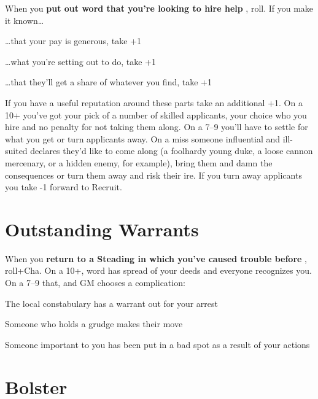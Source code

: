 When you {\bf put out word that you're looking to hire help} , roll. If you make it known…

 
\startitemize[1,packed]

\item …that your pay is generous, take +1

 
\item …what you're setting out to do, take +1

 
\item …that they'll get a share of whatever you find, take +1


\stopitemize
 

If you have a useful reputation around these parts take an additional +1. On a 10+ you've got your pick of a number of skilled applicants, your choice who you hire and no penalty for not taking them along. On a 7–9 you'll have to settle for what you get or turn applicants away. On a miss someone influential and ill-suited declares they'd like to come along (a foolhardy young duke, a loose cannon mercenary, or a hidden enemy, for example), bring them and damn the consequences or turn them away and risk their ire. If you turn away applicants you take -1 forward to Recruit.

 
\section{Outstanding Warrants}   
 

When you {\bf return to a Steading in which you've caused trouble before} , roll+Cha. On a 10+, word has spread of your deeds and everyone recognizes you. On a 7–9 that, and GM chooses a complication:

 
\startitemize[1,packed]

\item The local constabulary has a warrant out for your arrest

 
\item Someone who holds a grudge makes their move

 
\item Someone important to you has been put in a bad spot as a result of your actions


\stopitemize
 
\section{Bolster}   
 

